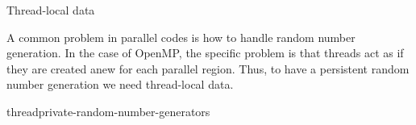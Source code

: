 

 {Thread-local data}

A common problem in parallel codes is how to handle random number generation.
In the case of OpenMP, the specific problem is that threads
act as if they are created anew for each parallel region.
Thus, to have a persistent random number generation we need
thread-local data.

\begin{block}{threadprivate-random-number-generators}
    
\end{block}

